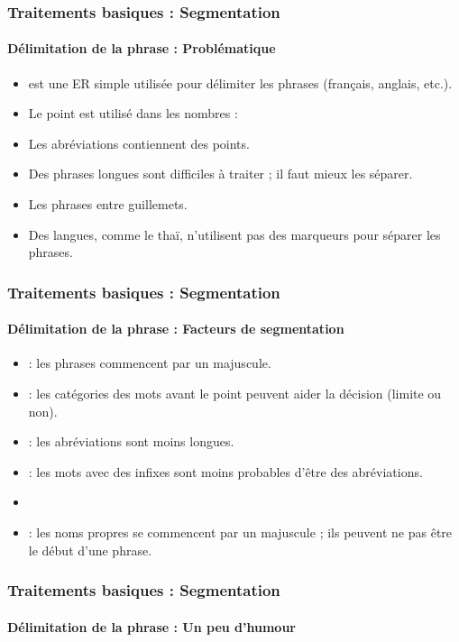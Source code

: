 \documentclass[xcolor=table]{beamer}
\begin{document}
\begin{frame}
\frametitle{Traitements basiques : Segmentation}
\framesubtitle{Délimitation de la phrase : Problématique} 

\begin{itemize}
	\item \expword{/[.?!]/} est une ER simple utilisée pour délimiter les phrases (français, anglais, etc.).
	\item Le point est utilisé dans les nombres : 
	\item Les abréviations contiennent des points.
	\item Des phrases longues sont difficiles à traiter ; il faut mieux les séparer.
	\item Les phrases entre guillemets.
	\item Des langues, comme le thaï, n'utilisent pas des marqueurs pour séparer les phrases.
\end{itemize}

\end{frame}

\begin{frame}
\frametitle{Traitements basiques : Segmentation}
\framesubtitle{Délimitation de la phrase : Facteurs de segmentation} 

\begin{itemize}
	\item {} : les phrases commencent par un majuscule.
	\item {} : les catégories des mots avant le point peuvent aider la décision (limite ou non).
	\item {} : les abréviations sont moins longues.
	\item {} : les mots avec des infixes sont moins probables d'être des abréviations.
	\item {} 
	\item {} : les noms propres se commencent par un majuscule ; ils peuvent ne pas être le début d'une phrase.
\end{itemize}

\end{frame}

\begin{frame}
\frametitle{Traitements basiques : Segmentation}
\framesubtitle{Délimitation de la phrase : Un peu d'humour} 


\end{frame}
\end{document}
